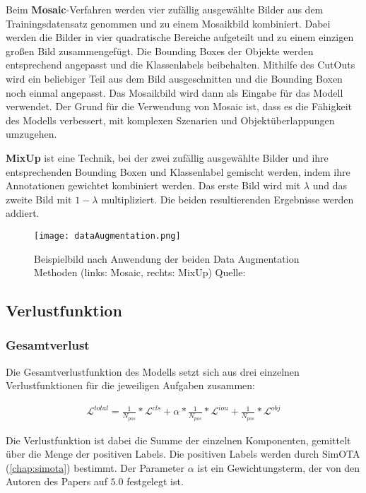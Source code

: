 Beim \textbf{Mosaic}-Verfahren werden vier zufällig ausgewählte Bilder aus dem Trainingsdatensatz genommen und zu einem Mosaikbild kombiniert. Dabei werden die Bilder in vier quadratische Bereiche aufgeteilt und zu einem einzigen großen Bild zusammengefügt. Die Bounding Boxes der Objekte werden entsprechend angepasst und die Klassenlabels beibehalten. Mithilfe des CutOuts wird ein beliebiger Teil aus dem Bild ausgeschnitten und die Bounding Boxen noch einmal angepasst. Das Mosaikbild wird dann als Eingabe für das Modell verwendet. Der Grund für die Verwendung von Mosaic ist, dass es die Fähigkeit des Modells verbessert, mit komplexen Szenarien und Objektüberlappungen umzugehen.

\textbf{MixUp} ist eine Technik, bei der zwei zufällig ausgewählte Bilder und ihre entsprechenden Bounding Boxen und Klassenlabel gemischt werden, indem ihre Annotationen gewichtet kombiniert werden. Das erste Bild wird mit $\lambda$ und das zweite Bild mit $1-\lambda$ multipliziert. Die beiden resultierenden Ergebnisse werden addiert. \cite{yoloxExplanationAug}

\begin{figure}[h]
	\centering
	\texttt{[image: dataAugmentation.png]}
	\caption[Beispielbild nach Anwendung der beiden Data Augmentation Methoden]{Beispielbild nach Anwendung der beiden Data Augmentation Methoden (links: Mosaic, rechts: MixUp) Quelle: \cite{yoloxExplanationAug}}
	\label{fig:yoloxExplanationAug}
\end{figure}



\subsection{Verlustfunktion}
\subsubsection{Gesamtverlust}
Die Gesamtverlustfunktion des Modells setzt sich aus drei einzelnen Verlustfunktionen für die jeweiligen Aufgaben zusammen:

\begin{align}
	\mathcal{L}^{total}=\frac{1}{N_{pos}}*\mathcal{L}^{cls}+\alpha*\frac{1}{N_{pos}}*	\mathcal{L}^{iou}+	\frac{1}{N_{pos}}*\mathcal{L}^{obj}
\end{align}

Die Verlustfunktion ist dabei die Summe der einzelnen Komponenten, gemittelt über die Menge der positiven Labels. Die positiven Labels werden durch SimOTA (\ref{chap:simota}) bestimmt. Der Parameter $\alpha$ ist ein Gewichtungsterm, der von den Autoren des Papers auf $5.0$ festgelegt ist.

